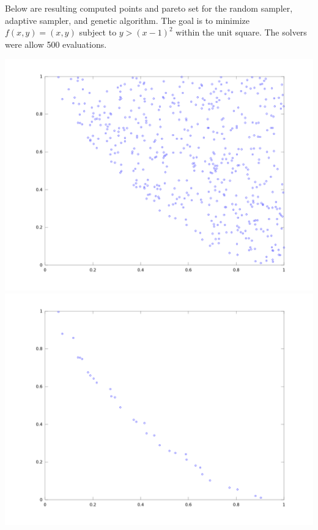 \documentclass{article}
\begin{document}
Below are resulting computed points and pareto set for the random sampler, adaptive sampler, and genetic algorithm.
The goal is to minimize $f(x,y) = (x,y)$ subject to $y > (x-1)^2$ within the unit square.
The solvers were allow 500 evaluations.

\includegraphics[scale=.1]{sampled_points.png}
\includegraphics[scale=.1]{sampled_pareto.png}
\end{document}
